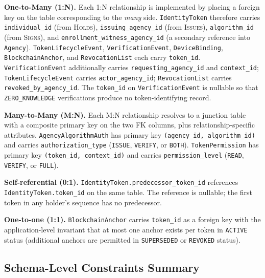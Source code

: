 \documentclass[11pt,letterpaper]{article}
\newcommand{\entity}[1]{\texttt{\color{navydark}#1}}
\begin{document}
\textbf{One-to-Many (1:N).} Each 1:N relationship is implemented by placing a foreign key on the table corresponding to the \textit{many} side. \entity{IdentityToken} therefore carries \texttt{individual\_id} (from \textsc{Holds}), \texttt{issuing\_agency\_id} (from \textsc{Issues}), \texttt{algorithm\_id} (from \textsc{Signs}), and \texttt{enrollment\_witness\_agency\_id} (a secondary reference into \entity{Agency}). \entity{TokenLifecycleEvent}, \entity{VerificationEvent}, \entity{DeviceBinding}, \entity{BlockchainAnchor}, and \entity{RevocationList} each carry \texttt{token\_id}. \entity{VerificationEvent} additionally carries \texttt{requesting\_agency\_id} and \texttt{context\_id}; \entity{TokenLifecycleEvent} carries \texttt{actor\_agency\_id}; \entity{RevocationList} carries \texttt{revoked\_by\_agency\_id}. The \texttt{token\_id} on \entity{VerificationEvent} is nullable so that \texttt{ZERO\_KNOWLEDGE} verifications produce no token-identifying record.

\textbf{Many-to-Many (M:N).} Each M:N relationship resolves to a junction table with a composite primary key on the two FK columns, plus relationship-specific attributes. \entity{AgencyAlgorithmAuth} has primary key \texttt{(agency\_id, algorithm\_id)} and carries \texttt{authorization\_type} (\texttt{ISSUE}, \texttt{VERIFY}, or \texttt{BOTH}). \entity{TokenPermission} has primary key \texttt{(token\_id, context\_id)} and carries \texttt{permission\_level} (\texttt{READ}, \texttt{VERIFY}, or \texttt{FULL}).

\textbf{Self-referential (0:1).} \texttt{IdentityToken.predecessor\_token\_id} references \texttt{IdentityToken.token\_id} on the same table. The reference is nullable; the first token in any holder's sequence has no predecessor.

\textbf{One-to-one (1:1).} \entity{BlockchainAnchor} carries \texttt{token\_id} as a foreign key with the application-level invariant that at most one anchor exists per token in \texttt{ACTIVE} status (additional anchors are permitted in \texttt{SUPERSEDED} or \texttt{REVOKED} status).

\subsection{Schema-Level Constraints Summary}
\end{document}

